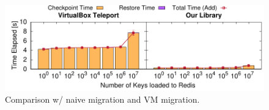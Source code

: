 \documentclass[9pt,    %
    english,            %
    xcolor=table,       %
    envcountsect,        %
    aspectratio=169     %
]{beamer}
\begin{document}
\begin{frame}
\begin{columns}
\begin{column}{.5\textwidth}
\begin{figure}
                \includegraphics[width=\textwidth]{./figs/vm_teleport.pdf}
                \caption{Comparison w/ naive migration and VM migration.\label{fig:tcp-microbecnhmark}}
            \end{figure}
        \end{column}
    \end{columns}
    
\end{frame}
\end{document}
